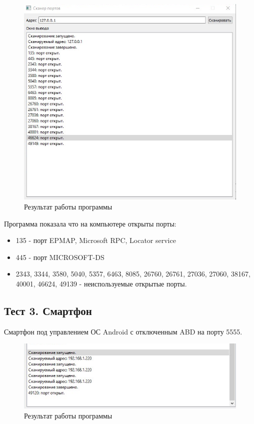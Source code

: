 \begin{figure}
\centering
\includegraphics{./files/screenshot.png}
\caption{Результат работы программы}
\end{figure}

Программа показала что на компьютере открыты порты:

\begin{itemize}
\item
  135 - порт EPMAP, Microsoft RPC, Locator service
\item
  445 - порт MICROSOFT-DS
\item
  2343, 3344, 3580, 5040, 5357, 6463, 8085, 26760, 26761, 27036, 27060,
  38167, 40001, 46624, 49139 - неиспользуемые открытые порты.
\end{itemize}

\hypertarget{ux442ux435ux441ux442-3.-ux441ux43cux430ux440ux442ux444ux43eux43d}{%
\subsection{Тест 3.
Смартфон}\label{ux442ux435ux441ux442-3.-ux441ux43cux430ux440ux442ux444ux43eux43d}}

Смартфон под управлением ОС Android с отключенным ABD на порту 5555.

\begin{figure}
\centering
\includegraphics{./files/screenshot3.png}
\caption{Результат работы программы}
\end{figure}

